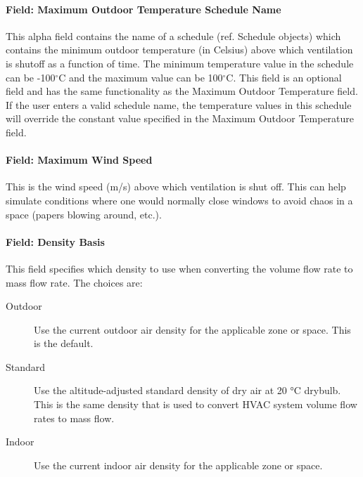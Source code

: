 \paragraph{Field: Maximum Outdoor Temperature Schedule Name}\label{field-maximum-outdoor-temperature-schedule-name}

This alpha field contains the name of a schedule (ref. Schedule objects) which contains the minimum outdoor temperature (in Celsius) above which ventilation is shutoff as a function of time. The minimum temperature value in the schedule can be -100$^\circ$C and the maximum value can be 100$^\circ$C. This field is an optional field and has the same functionality as the Maximum Outdoor Temperature field. If the user enters a valid schedule name, the temperature values in this schedule will override the constant value specified in the Maximum Outdoor Temperature field.

\paragraph{Field: Maximum Wind Speed}\label{field-maximum-wind-speed}

This is the wind speed (m/s) above which ventilation is shut off. This can help simulate conditions where one would normally close windows to avoid chaos in a space (papers blowing around, etc.).

\paragraph{Field: Density Basis}\label{field-density-basis-3}

This field specifies which density to use when converting the volume flow rate to mass flow rate. The choices are:

\begin{description}

\item[Outdoor] Use the current outdoor air density for the applicable zone or space. This is the default.

\item[Standard] Use the altitude-adjusted standard density of dry air at 20 °C drybulb. This is the same density that is used to convert HVAC system volume flow rates to mass flow.

\item[Indoor] Use the current indoor air density for the applicable zone or space.

\end{description}

